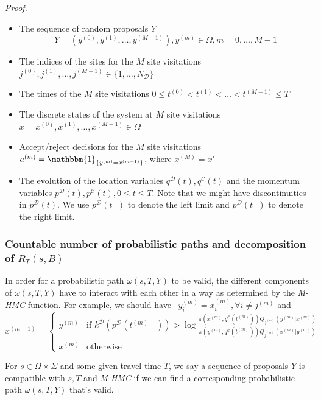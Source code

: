 \documentclass{article}
\newcommand{\cald}{\mathcal{D}}
\newcommand{\calc}{\mathcal{C}}
\begin{document}
\begin{proof}
\begin{itemize}
  \item The sequence of random proposals $Y$
  \[ Y = (y^{(0)}, y^{(1)}, \ldots, y^{(M - 1)}), y^{(m)} \in \Omega, m = 0, \ldots, M - 1 \] 
  \item The indices of the sites for the $M$ site visitations $j^{(0)}, j^{(1)}, \ldots, j^{(M - 1)}\in\{1, \dots, N_\cald\}$
  \item The times of the $M$ site visitations $0 \leqslant t^{(0)} < t^{(1)}< \ldots < t^{(M - 1)} \leqslant T$
  \item The discrete states of the system at $M$ site visitations $x = x^{(0)}, x^{(1)}, \ldots, x^{(M - 1)}\in\Omega$
  \item Accept/reject decisions for the $M$ site visitations $a^{(m)} = \mathbbm{1}_{\{y^{(m)} = x^{(m + 1)} \}}$, where $x^{(M)} = x'$
  \item The evolution of the location variables $q^\cald (t), q^\calc(t)$ and the momentum variables $p^\cald(t), p^\calc(t), 0 \leqslant t \leqslant T$. Note that we might have discontinuities in $p^\cald (t)$. We use $p^\cald (t^-)$ to denote the left limit and $p^\cald (t^+)$ to denote the right limit.
\end{itemize}

\subsubsection*{Countable number of probabilistic paths and decomposition of $R_T(s, B)$}

In order for a probabilistic path $\omega(s, T, Y)$ to be valid, the different components of $\omega(s, T, Y)$ have to interact with each other in a way as determined 
by the \textit{M-HMC} function. For example, we should have \ $y^{(m)}_i
= x^{(m)}_i, \forall i \neq j^{(m)}$ and
\[ x^{(m + 1)} = \left\{\begin{array}{ll}
		y^{(m)} & \text{if } k^\cald (p^\cald (t^{(m) -})) > \log \frac{\pi (x^{(m)}, q^{\calc}(t^{(m)}))
			Q_{j^{(m)}} (y^{(m)} |x^{(m)})}{\pi (y^{(m)}, q^{\calc}(t^{(m)})) Q_{j^{(m)}} (x^{(m)}
     |y^{(m)})}\\
     x^{(m)} & \text{otherwise}
   \end{array}\right. \]


For $s\in\Omega\times\Sigma$ and some given travel time $T$, we say a sequence of proposals $Y$ is compatible with $s, T$ and \textit{M-HMC} if we can find a corresponding probabilistic path $\omega(s, T, Y)$ that's valid. 


\end{proof}
\end{document}
